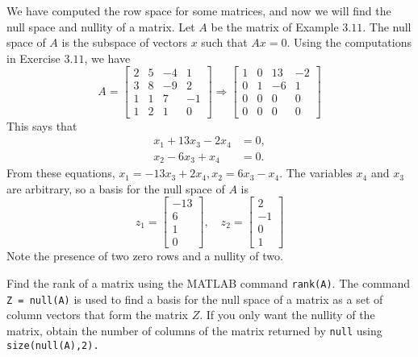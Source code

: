 \documentclass[../main.tex]{subfiles}
\begin{document}
\begin{example} \label{exm:exm_3_12}We have computed the row space for some matrices, and now we will find the null space and nullity of a matrix. Let $A$ be the matrix of Example $3.11 .$ The null space of $A$ is the subspace of vectors $x$ such that $A x=0 .$ Using the computations in Exercise $3.11$, we have
$$
A=\left[\begin{array}{cccc}
2 & 5 & -4 & 1 \\
3 & 8 & -9 & 2 \\
1 & 1 & 7 & -1 \\
1 & 2 & 1 & 0
\end{array}\right] \Longrightarrow\left[\begin{array}{cccc}
1 & 0 & 13 & -2 \\
0 & 1 & -6 & 1 \\
0 & 0 & 0 & 0 \\
0 & 0 & 0 & 0
\end{array}\right]
$$
This says that
$$
\begin{aligned}
x_{1}+13 x_{3}-2 x_{4} &=0, \\
x_{2}-6 x_{3}+x_{4} &=0.
\end{aligned}
$$
From these equations,
$x_{1}=-13 x_{3}+2 x_{4}, x_{2}=6 x_{3}-x_{4}$. The variables $x_{4}$ and $x_{3}$ are arbitrary, so a basis for the null space of $A$ is
$$
z_{1}=\left[\begin{array}{c}
-13 \\
6 \\
1 \\
0
\end{array}\right], \quad z_{2}=\left[\begin{array}{c}
2 \\
-1 \\
0 \\
1
\end{array}\right]
$$
Note the presence of two zero rows and a nullity of two.
\end{example}

Find the rank of a matrix using the MATLAB command \texttt{rank(A)}. The command \texttt{Z = null(A)} is used to find a basis for the null space of a matrix as a set of column vectors that form the matrix $Z$. If you only want the nullity of the matrix,
obtain the number of columns of the matrix returned by \texttt{null} using \texttt{size(null(A),2).}
\end{document}
